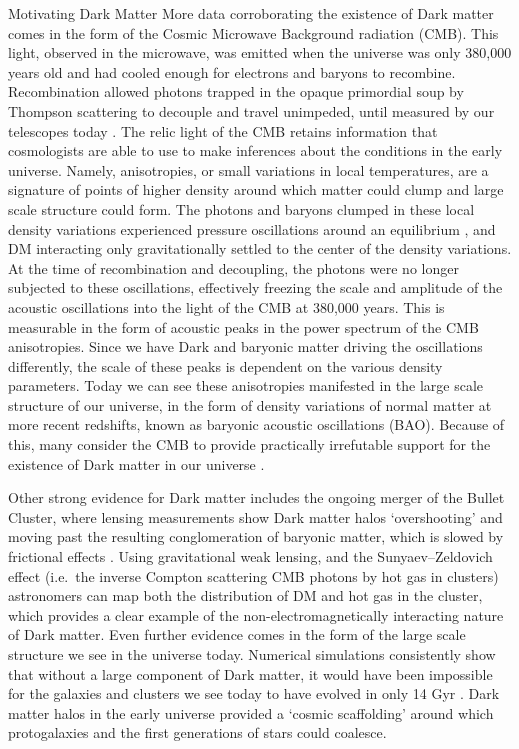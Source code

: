 \documentclass[a4paper,11pt]{article}
\begin{document}
\begin{section}{Motivating Dark Matter}
    More data corroborating the existence of Dark matter comes in the form of the Cosmic Microwave Background radiation (CMB).
    This light, observed in the microwave, was emitted when the universe was only 380,000 years old and had cooled enough for electrons and baryons to recombine.
    Recombination allowed photons trapped in the opaque primordial soup by Thompson scattering to decouple and travel unimpeded, until measured by our telescopes today \cite{Bertone:2018}.
    The relic light of the CMB retains information that cosmologists are able to use to make inferences about the conditions in the early universe. Namely, anisotropies, or small variations in local temperatures, are a signature of points of higher density around which matter could clump and large scale structure could form.
    The photons and baryons clumped in these local density variations experienced pressure oscillations around an equilibrium \cite{Eisenstein:2005}, and DM interacting only gravitationally settled to the center of the density variations.
    At the time of recombination and decoupling, the photons were no longer subjected to these oscillations, effectively freezing the scale and amplitude of the acoustic oscillations into the light of the CMB at 380,000 years.
    This is measurable in the form of acoustic peaks in the power spectrum of the CMB anisotropies. 
    Since we have Dark and baryonic matter driving the oscillations differently, the scale of these peaks is dependent on the various density parameters.
    Today we can see these anisotropies manifested in the large scale structure of our universe, in the form of density variations of normal matter at more recent redshifts, known as baryonic acoustic oscillations (BAO).
    Because of this, many consider the CMB to provide practically irrefutable support for the existence of Dark matter in our universe \cite{Freese:2017dm}.

    Other strong evidence for Dark matter includes the ongoing merger of the Bullet Cluster, where lensing measurements show Dark matter halos `overshooting' and moving past the resulting conglomeration of baryonic matter, which is slowed by frictional effects \cite{Clowe:2004}.
    Using gravitational weak lensing, and the Sunyaev–Zeldovich effect (i.e.~the inverse Compton scattering CMB photons by hot gas in clusters) astronomers can map both the distribution of DM and hot gas in the cluster, which provides a clear example of the non-electromagnetically interacting nature of Dark matter.
    Even further evidence comes in the form of the large scale structure we see in the universe today.
    Numerical simulations consistently show that without a large component of Dark matter, it would have been impossible for the galaxies and clusters we see today to have evolved in only 14 Gyr \cite{Springel:2005}.
    Dark matter halos in the early universe provided a `cosmic scaffolding' around which protogalaxies and the first generations of stars could coalesce. 


\end{section}
\end{document}
